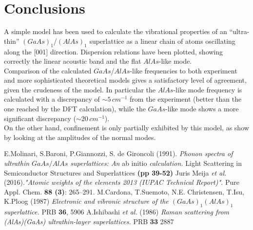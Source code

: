 \documentclass{article}
\begin{document}
\newpage
\section*{Conclusions}
A simple model has been used to calculate the vibrational properties of an “ultra-thin” $(GaAs)_1$/$(AlAs)_1$ superlattice as a linear chain of atoms oscillating along the [001] direction. Dispersion relations have been plotted, showing correctly the linear acoustic band and the flat $AlAs$-like mode.\\
Comparison of the calculated $GaAs$/$AlAs$-like frequencies to both experiment and more sophisticated theoretical models gives a satisfactory level of agreement, given the crudeness of the model. In particular the $AlAs$-like mode frequency is calculated with a discrepancy of $\sim\!\!5 \,cm^{-1}$ from the experiment (better than the one reached by the DFT calculation), while the $GaAs$-like mode shows a more significant discrepancy ($\sim\!20 \,cm^{-1}$).\\
On the other hand, confinement is only partially exhibited by this model, as show by looking at the amplitudes of the normal modes.

\appendix
\newpage
\begin{thebibliography}{9}
		E.Molinari, S.Baroni, P.Giannozzi, S. de Gironcoli (1991).
		\emph{Phonon spectra of ultrathin $GaAs/AlAs$ superlattices: An} ab initio \emph{calculation.} {\color{Burgundy} Light Scattering in Semiconductor Structures and Superlattices \textbf{(pp 39-52)}}
		Juris Meija \emph{et al.} (2016).\emph{"Atomic weights of the elements 2013 (IUPAC Technical Report)".} {\color{Burgundy} Pure Appl. Chem. \textbf{88 (3)}: 265–291.}
		M.Cardona, T.Suemoto, N.E. Christensen, T.Isu, K.Ploog (1987)
		\emph{Electronic and vibronic structure of the $(GaAs)_1(AlAs)_1$ superlattice.} {\color{Burgundy} PRB \textbf{36}, 5906}
		A.Ishibashi \emph{et al.} (1986)
		\emph{Raman scattering from (AlAs)(GaAs) ultrathin-layer superlattices.} {\color{Burgundy} PRB \textbf{33} 2887}
\end{thebibliography}
\end{document}
